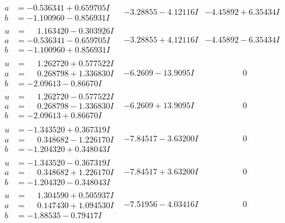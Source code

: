 \documentclass[1p]{elsarticle_modified}
\theoremstyle{definition}
\begin{document}
$$\begin{array}{c|c|c}
\begin{aligned}
a &= -0.536341 + 0.659705 I \\
b &= -1.100960 - 0.856931 I\end{aligned}
 & -3.28855 - 4.12116 I & -4.45892 + 6.35434 I \\ \hline\begin{aligned}
u &= \phantom{-}1.163420 - 0.303926 I \\
a &= -0.536341 - 0.659705 I \\
b &= -1.100960 + 0.856931 I\end{aligned}
 & -3.28855 + 4.12116 I & -4.45892 - 6.35434 I \\ \hline\begin{aligned}
u &= \phantom{-}1.262720 + 0.577522 I \\
a &= \phantom{-}0.268798 + 1.336830 I \\
b &= -2.09613 - 0.86670 I\end{aligned}
 & -6.2609 - 13.9095 I & \phantom{-0.000000 } 0 \\ \hline\begin{aligned}
u &= \phantom{-}1.262720 - 0.577522 I \\
a &= \phantom{-}0.268798 - 1.336830 I \\
b &= -2.09613 + 0.86670 I\end{aligned}
 & -6.2609 + 13.9095 I & \phantom{-0.000000 } 0 \\ \hline\begin{aligned}
u &= -1.343520 + 0.367319 I \\
a &= \phantom{-}0.348682 - 1.226170 I \\
b &= -1.204320 + 0.348043 I\end{aligned}
 & -7.84517 - 3.63200 I & \phantom{-0.000000 } 0 \\ \hline\begin{aligned}
u &= -1.343520 - 0.367319 I \\
a &= \phantom{-}0.348682 + 1.226170 I \\
b &= -1.204320 - 0.348043 I\end{aligned}
 & -7.84517 + 3.63200 I & \phantom{-0.000000 } 0 \\ \hline\begin{aligned}
u &= \phantom{-}1.304590 + 0.505937 I \\
a &= \phantom{-}0.147430 + 1.094530 I \\
b &= -1.88535 - 0.79417 I\end{aligned}
 & -7.51956 - 4.03416 I & \phantom{-0.000000 } 0 \\ \hline\begin{aligned}

\end{aligned}
\end{array}$$
\end{document}
